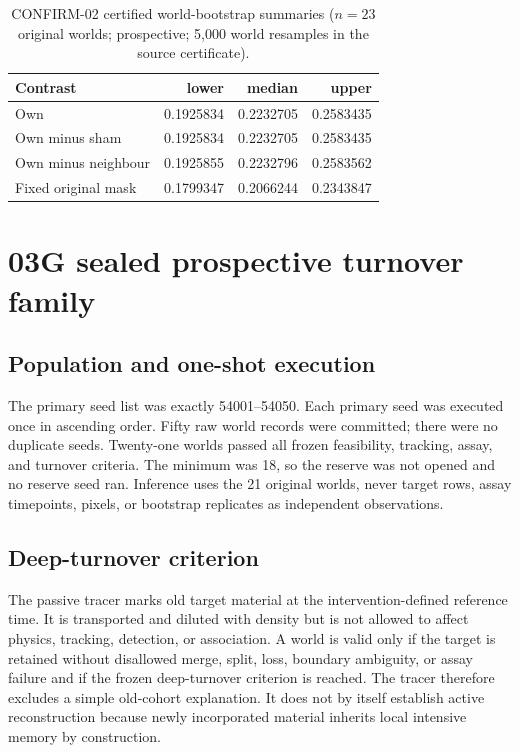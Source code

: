 \documentclass[10pt]{article}
\begin{document}
\begin{table}[ht]
\centering
\caption{CONFIRM-02 certified world-bootstrap summaries ($n=23$ original worlds; prospective; 5,000 world resamples in the source certificate).}
\begin{tabular}{lrrr}
\toprule
Contrast & lower & median & upper \\
\midrule
Own & 0.1925834 & 0.2232705 & 0.2583435 \\
Own minus sham & 0.1925834 & 0.2232705 & 0.2583435 \\
Own minus neighbour & 0.1925855 & 0.2232796 & 0.2583562 \\
Fixed original mask & 0.1799347 & 0.2066244 & 0.2343847 \\
\bottomrule
\end{tabular}
\end{table}

\section{03G sealed prospective turnover family}

\subsection{Population and one-shot execution}

The primary seed list was exactly 54001--54050. Each primary seed was executed once in ascending order. Fifty raw world records were committed; there were no duplicate seeds. Twenty-one worlds passed all frozen feasibility, tracking, assay, and turnover criteria. The minimum was 18, so the reserve was not opened and no reserve seed ran. Inference uses the 21 original worlds, never target rows, assay timepoints, pixels, or bootstrap replicates as independent observations.

\subsection{Deep-turnover criterion}

The passive tracer marks old target material at the intervention-defined reference time. It is transported and diluted with density but is not allowed to affect physics, tracking, detection, or association. A world is valid only if the target is retained without disallowed merge, split, loss, boundary ambiguity, or assay failure and if the frozen deep-turnover criterion is reached. The tracer therefore excludes a simple old-cohort explanation. It does not by itself establish active reconstruction because newly incorporated material inherits local intensive memory by construction.
\end{document}
